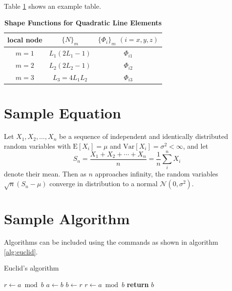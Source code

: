 \documentclass[9pt,twocolumn,twoside]{opticajnl}
\begin{document}
Table \ref{tab:shape-functions} shows an example table.

\begin{table}[htbp]
\centering
\caption{\bf Shape Functions for Quadratic Line Elements}
\begin{tabular}{ccc}
\hline
local node & $\{N\}_m$ & $\{\Phi_i\}_m$ $(i=x,y,z)$ \\
\hline
$m = 1$ & $L_1(2L_1-1)$ & $\Phi_{i1}$ \\
$m = 2$ & $L_2(2L_2-1)$ & $\Phi_{i2}$ \\
$m = 3$ & $L_3=4L_1L_2$ & $\Phi_{i3}$ \\
\hline
\end{tabular}
  \label{tab:shape-functions}
\end{table}

\section{Sample Equation}

Let $X_1, X_2, \ldots, X_n$ be a sequence of independent and identically distributed random variables with $\text{E}[X_i] = \mu$ and $\text{Var}[X_i] = \sigma^2 < \infty$, and let
\begin{equation}
S_n = \frac{X_1 + X_2 + \cdots + X_n}{n}
      = \frac{1}{n}\sum_{i}^{n} X_i
\label{eq:refname1}
\end{equation}
denote their mean. Then as $n$ approaches infinity, the random variables $\sqrt{n}(S_n - \mu)$ converge in distribution to a normal $\mathcal{N}(0, \sigma^2)$.

\section{Sample Algorithm}

Algorithms can be included using the commands as shown in algorithm \ref{alg:euclid}.

\begin{algorithm}
\caption{Euclid’s algorithm}\label{alg:euclid}
\begin{algorithmic}[1]
\State $r\gets a\bmod b$
\State $a\gets b$
\State $b\gets r$
\State $r\gets a\bmod b$
\EndWhile\label{euclidendwhile}
\State \textbf{return} $b$
\EndProcedure
\end{algorithmic}
\end{algorithm}
\end{document}

